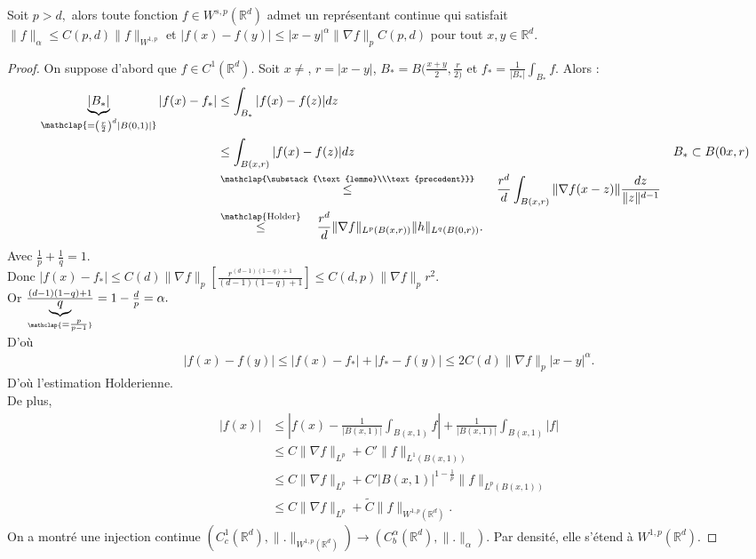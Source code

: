 \begin{theoreme}
    Soit $p>d,$ alors toute fonction $f\in W^{s,p}(\mathbb{R} ^d)$ admet un représentant continue qui satisfait \\
    $\|f\|_\alpha  \le C(p,d)\|f\|_{W^{1,p}}$ et $|f(x)-f(y)| \le |x-y| ^\alpha \|\nabla f\|_pC(p,d)$ pour tout $x,y\in \mathbb{R} ^d.$
\end{theoreme}
\begin{proof}
    On suppose d'abord que $f\in C^1(\mathbb{R} ^d)$. Soit $x\neq $, $r=|x-y| $, $B_*=B(\frac{x+y}{2},\frac{r}{2)}$ et $f_*=\frac{1}{|B_*|}\int_{B_*}f.$ Alors :
    \begin{align*}
        \hspace{1em}\underbrace{|B_*|}_{\mathclap{\substack{=\left( \frac{r}{2} \right) ^d|B(0,1)|  }}}|f(x)-f_*| &\le \int_{B_*}|f(x)-f(z)| dz\\
                          &\le \int_{B(x,r)}|f(x)-f(z)|dz &B_*\subset B(0x,r)\\
                          &\overset{\mathclap{\substack{\text{lemme}\\\text{precedent}}}}{\le}\hspace{1.5em} \frac{r^d}{d}\int_{B(x,r)}\|\nabla f(x-z)\|\frac{dz}{\|z\|^{d-1}}\\
                          &\overset{\mathclap{\text{Holder}}}{\le}\hspace{1em} \frac{r^d}{d}\|\nabla f\|_{L^p(B(x,r))}\|h\|_{L^q(B(0,r))}.
    \end{align*}
    Avec $\frac{1}{p}+\frac{1}{q}=1.$\\
    Donc $|f(x)-f_*| \le C(d)\|\nabla f\|_p\left[ \frac{r^{(d-1)(1-q)+1}}{(d-1)(1-q)+1} \right] \le C(d,p)\|\nabla f\|_pr^2$. \\
    Or $\frac{(d-1)(1-q)+1}{\underbrace{q}_{\mathclap{\substack{=\frac{p}{p-1}}}}}=1-\frac{d}{p}=\alpha .$ \\
    D'où
    \begin{align*}
        |f(x)-f(y)| \le |f(x)-f_*| +|f_*-f(y)|\le 2C(d)\|\nabla f\|_p|x-y| ^\alpha .
    \end{align*}
    D'où l'estimation Holderienne.\\
    De plus,
     \begin{align*}
         |f(x)| &\le |f(x)-\frac{1}{|B(x,1)|}\int_{B(x,1)}f|+ \frac{1}{|B(x,1)| }\int_{B(x,1)}|f|\\
                &\le C\|\nabla f\|_{L^p}+C'\|f\|_{L^1(B(x,1))}\\
                &\le  C\|\nabla f\|_{L^p}+C'|B(x,1)| ^{1-\frac{1}{p}}\|f\|_{L^p(B(x,1))}\\
                &\le  C\|\nabla f\|_{L^p}+\tilde{C}\|f\|_{W^{1,p}(\mathbb{R} ^d)}.
    \end{align*}
    On a montré une injection continue $\left( C^1_c(\mathbb{R} ^d),\|.\|_{W^{1,p}(\mathbb{R} ^d)} \right) \to \left( C_b^\alpha (\mathbb{R} ^d), \|.\|_\alpha  \right) $. Par densité, elle s'étend à $W^{1,p}(\mathbb{R} ^d).$
\end{proof}
